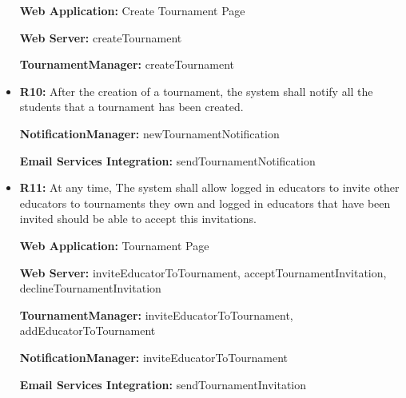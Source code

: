 \documentclass{article}
\begin{document}
\begin{itemize}
    \textbf{Web Application:} Create Tournament Page

    \textbf{Web Server:} createTournament

    \textbf{TournamentManager:} createTournament

    \item \textbf{R10:} After the creation of a tournament, the system shall notify all the students that a tournament has been created.

    \textbf{NotificationManager:} newTournamentNotification

    \textbf{Email Services Integration:} sendTournamentNotification

    \item \textbf{R11:} At any time, The system shall allow logged in educators to invite other educators to tournaments they own and logged in educators that have been invited should be able to accept this invitations.
    
    \textbf{Web Application:} Tournament Page

    \textbf{Web Server:} inviteEducatorToTournament, acceptTournamentInvitation, declineTournamentInvitation

    \textbf{TournamentManager:} inviteEducatorToTournament, addEducatorToTournament

    \textbf{NotificationManager:} inviteEducatorToTournament

    \textbf{Email Services Integration:} sendTournamentInvitation


\end{itemize}
\end{document}
